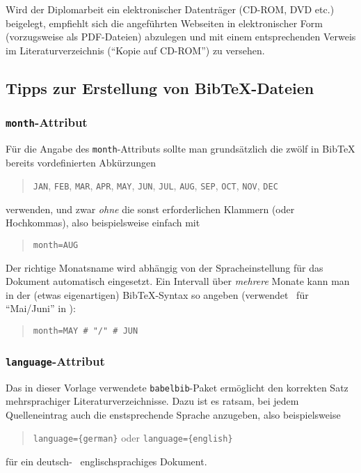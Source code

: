 Wird der Diplomarbeit ein elektronischer Datenträger (CD-ROM, DVD
etc.) beigelegt, empfiehlt sich die angeführten Webseiten in
elektronischer Form (vorzugsweise als PDF-Da\-tei\-en) abzulegen
und mit einem entsprechenden Verweis im Literaturverzeichnis
("`Kopie auf CD-ROM"') zu versehen.

\subsection{Tipps zur Erstellung von BibTeX-Dateien}
\label{sec:TippsZuBibtex}

\subsubsection{\texttt{month}-Attribut}

Für die Angabe des \texttt{month}-Attributs sollte man grundsätzlich die zwölf in BibTeX bereits vordefinierten Abkürzungen
\begin{quote}
\texttt{JAN}, \texttt{FEB}, \texttt{MAR}, \texttt{APR}, 
\texttt{MAY}, \texttt{JUN}, \texttt{JUL}, \texttt{AUG}, 
\texttt{SEP}, \texttt{OCT}, \texttt{NOV}, \texttt{DEC}
\end{quote}
verwenden, und zwar \emph{ohne} die sonst erforderlichen Klammern (oder Hochkommas), also beispielsweise einfach mit
%
\begin{quote}
\verb!month=AUG!
\end{quote}
%
Der richtige Monatsname wird abhängig von der Spracheinstellung für das Dokument automatisch eingesetzt.
Ein Intervall über \emph{mehrere} Monate kann man in der (etwas eigenartigen) BibTeX-Syntax so angeben (verwendet \zB\ für "`Mai/Juni"' in \cite{Guttman01}):
\begin{quote}
\verb!month=MAY # "/" # JUN!
\end{quote}


\subsubsection{\texttt{language}-Attribut}

Das in dieser Vorlage verwendete \verb!babelbib!-Paket ermöglicht den korrekten Satz mehrsprachiger Literaturverzeichnisse. Dazu ist es ratsam, bei jedem Quelleneintrag auch die enstsprechende Sprache anzugeben, also beispielsweise
\begin{quote}
\verb!language={german}! \quad oder \quad \verb!language={english}!
\end{quote}
für ein deutsch- \bzw\ englischsprachiges Dokument.

